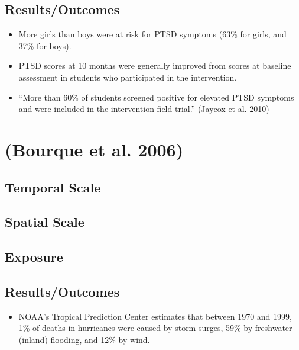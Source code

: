 \documentclass[
]{article}
\providecommand{\tightlist}{%
  \setlength{\itemsep}{0pt}\setlength{\parskip}{0pt}}
\begin{document}
\hypertarget{resultsoutcomes-6}{%
\subsection{Results/Outcomes}\label{resultsoutcomes-6}}

\begin{itemize}
\tightlist
\item
  More girls than boys were at risk for PTSD symptoms (63\% for girls,
  and 37\% for boys).
\item
  PTSD scores at 10 months were generally improved from scores at
  baseline assessment in students who participated in the intervention.
\item
  ``More than 60\% of students screened positive for elevated PTSD
  symptoms and were included in the intervention field trial.'' (Jaycox
  et al. 2010)
\end{itemize}

\hypertarget{bourque2006weathering}{%
\section{(Bourque et al. 2006)}\label{bourque2006weathering}}

\hypertarget{temporal-scale-5}{%
\subsection{Temporal Scale}\label{temporal-scale-5}}

\hypertarget{spatial-scale-8}{%
\subsection{Spatial Scale}\label{spatial-scale-8}}

\hypertarget{exposure-2}{%
\subsection{Exposure}\label{exposure-2}}

\hypertarget{resultsoutcomes-7}{%
\subsection{Results/Outcomes}\label{resultsoutcomes-7}}

\begin{itemize}
\tightlist
\item
  NOAA's Tropical Prediction Center estimates that between 1970 and
  1999, 1\% of deaths in hurricanes were caused by storm surges, 59\% by
  freshwater (inland) flooding, and 12\% by wind.
\end{itemize}
\end{document}
